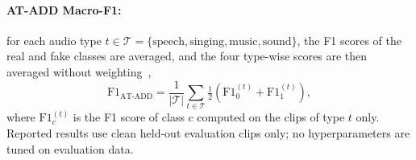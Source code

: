 \paragraph{AT-ADD Macro-F1:} for each audio type $t \in \mathcal{T} = \{\text{speech}, \text{singing}, \text{music}, \text{sound}\}$, the F1 scores of the real and fake classes are averaged, and the four type-wise scores are then averaged without weighting~\cite{xie2026atadd},
\begin{equation}
\mathrm{F1}_{\mathrm{AT\text{-}ADD}} = \frac{1}{|\mathcal{T}|}\sum_{t \in \mathcal{T}} \tfrac{1}{2}\left(\mathrm{F1}_{0}^{(t)} + \mathrm{F1}_{1}^{(t)}\right),
\label{eq:atadd}
\end{equation}
where $\mathrm{F1}_{c}^{(t)}$ is the F1 score of class $c$ computed on the clips of type $t$ only. Reported results use clean held-out evaluation clips only; no hyperparameters are tuned on evaluation data.
